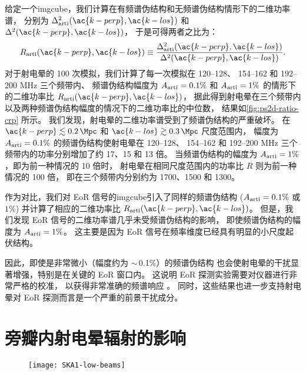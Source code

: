 给定一个\ac{imgcube}，我们计算在有频谱伪结构和无频谱伪结构情形下的二维功率谱，
分别为 $\Delta^2_{\R{arti}}(\ac{k-perp}, \ac{k-los})$
和 $\Delta^2(\ac{k-perp}, \ac{k-los})$，
于是可得两者之比为：
\begin{equation}
  R_{\R{arti}}(\ac{k-perp}, \ac{k-los})
    \equiv \frac{\Delta^2_{\R{arti}}(\ac{k-perp}, \ac{k-los})}{
      \Delta^2(\ac{k-perp}, \ac{k-los})} .
\end{equation}
对于射电晕的 100 次模拟，我们计算了每一次模拟在 \numrange{120}{128}、
\numrange{154}{162} 和 \numrange{192}{200} \si{\MHz} 三个频带内、
频谱伪结构幅度为 $A_{\mathrm{arti}} = 0.1\%$ 和 $A_{\mathrm{arti}} = 1\%$
的情形下的二维功率比 $R_{\R{arti}}(\ac{k-perp}, \ac{k-los})$，
据此得到射电晕在三个频带内以及两种频谱伪结构幅度的情况下的二维功率比的中位数，
结果如\autoref{fig:ps2d-ratio-crp} 所示。
我们发现，射电晕的二维功率谱受到了频谱伪结构的严重破坏。
在 $\ac{k-perp} \lesssim \SI{0.2}{\per\Mpc}$ 和
$\ac{k-los} \gtrsim \SI{0.3}{\per\Mpc}$ 尺度范围内，
幅度为 $A_{\mathrm{arti}} = 0.1\%$ 的频谱伪结构使射电晕在 \numrange{120}{128}、
\numrange{154}{162} 和 \numrange{192}{200} \si{\MHz}
三个频带内的功率分别增加了约 17、15 和 13 倍。
当频谱伪结构的幅度为 $A_{\mathrm{arti}} = 1\%$，即为前一种情况的 10 倍时，
射电晕在相同尺度范围内的功率比 $R$ 则为前一种情况的 100 倍，
即在三个频带内分别约为 1700、1500 和 1300。

作为对比，我们对 EoR 信号的\ac{imgcube}引入了同样的频谱伪结构
($A_{\mathrm{arti}} = 0.1\%$ 或 $1\%$)
并计算了相应的二维功率比 $R_{\R{arti}}(\ac{k-perp}, \ac{k-los})$。
但是，我们发现 EoR 信号的二维功率谱几乎未受频谱伪结构的影响，
即使频谱伪结构的幅度为 $A_{\mathrm{arti}} = 1\%$。
这主要是因为 EoR 信号在频率维度已经具有明显的小尺度起伏结构。

因此，即使是非常微小（幅度约为 $\sim$\,0.1\%）的频谱伪结构
也会使射电晕的干扰显著增强，特别是在关键的 EoR 窗口内。
这说明 EoR 探测实验需要对仪器进行非常严格的校准，
以获得非常准确的频谱响应 \cite{barry2016}。
同时，这些结果也进一步支持射电晕对 EoR 探测而言是一个严重的前景干扰成分。


\section{旁瓣内射电晕辐射的影响}
\label{sec:fscn}

\begin{figure}[htp]
  \centering
  \texttt{[image: SKA1-low-beams]}
  \label{fig:ska-beams}
\end{figure}

